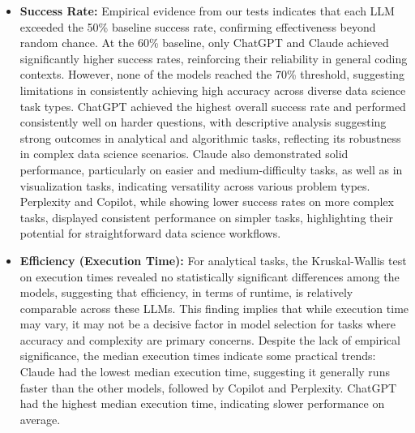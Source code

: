 \documentclass[conference]{IEEEtran}
\begin{document}
\begin{itemize}
    \item \textbf{Success Rate:} Empirical evidence from our tests indicates that each LLM exceeded the 50\% baseline success rate, confirming effectiveness beyond random chance. At the 60\% baseline, only ChatGPT and Claude achieved significantly higher success rates, reinforcing their reliability in general coding contexts. However, none of the models reached the 70\% threshold, suggesting limitations in consistently achieving high accuracy across diverse data science task types. ChatGPT achieved the highest overall success rate and performed consistently well on harder questions, with descriptive analysis suggesting strong outcomes in analytical and algorithmic tasks, reflecting its robustness in complex data science scenarios. Claude also demonstrated solid performance, particularly on easier and medium-difficulty tasks, as well as in visualization tasks, indicating versatility across various problem types. Perplexity and Copilot, while showing lower success rates on more complex tasks, displayed consistent performance on simpler tasks, highlighting their potential for straightforward data science workflows. 
    
    \item \textbf{Efficiency (Execution Time):} For analytical tasks, the Kruskal-Wallis test on execution times revealed no statistically significant differences among the models, suggesting that efficiency, in terms of runtime, is relatively comparable across these LLMs. This finding implies that while execution time may vary, it may not be a decisive factor in model selection for tasks where accuracy and complexity are primary concerns.
    Despite the lack of empirical significance, the median execution times indicate some practical trends: Claude had the lowest median execution time, suggesting it generally runs faster than the other models, followed by Copilot and Perplexity. ChatGPT had the highest median execution time, indicating slower performance on average. 


\end{itemize}
\end{document}
